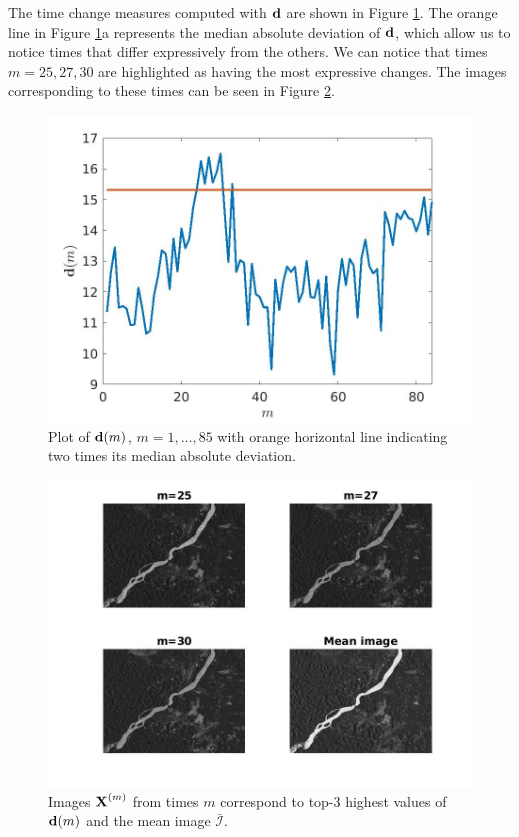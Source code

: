 \documentclass[journal]{IEEEtran}
\newcommand{\vd}{{\textbf d}}
\newcommand{\vX}{{\textbf X}}
\begin{document}
The time change measures computed with $\vd$ are shown in Figure \ref{F:forest_wecs}. The orange line in Figure \ref{F:forest_wecs}a represents the median absolute deviation of $\vd$, which allow us to notice times that differ expressively from the others. We can notice that times $m=25,27,30$ are highlighted as having the most expressive changes. The images  corresponding to these times can be seen in Figure \ref{F:forest_change_times}.

\begin{figure}[htp!]
\centering
\includegraphics[scale=.2]{../../figs/forest_vSumDifCoefSq}\hspace{-.5cm}
\caption{Plot of $\vd(m)$, $m=1,\ldots,85$ with orange horizontal line indicating two times its median absolute deviation.}
\label{F:forest_wecs}
\end{figure}


\begin{figure}[htp!]
\includegraphics[scale=.3]{../../figs/forest_changes_time} 
\caption{Images $\vX^{(m)}$ from times $m$ correspond to top-3 highest values of $\vd(m)$ and the mean image $\bar{\mathcal{I}}$.}
\label{F:forest_change_times}
\end{figure}
\end{document}
